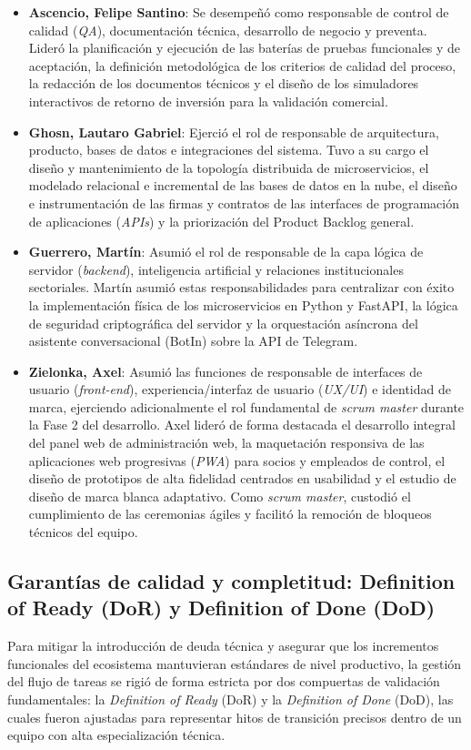 \documentclass[conference, a4paper]{IEEEtran}
\begin{document}
\begin{itemize}
    \item \textbf{Ascencio, Felipe Santino}: Se desempe\~n\'o como responsable de control de calidad (\textit{QA}), documentaci\'on t\'ecnica, desarrollo de negocio y preventa. Lider\'o la planificaci\'on y ejecuci\'on de las bater\'ias de pruebas funcionales y de aceptaci\'on, la definici\'on metodol\'ogica de los criterios de calidad del proceso, la redacci\'on de los documentos t\'ecnicos y el dise\~no de los simuladores interactivos de retorno de inversi\'on para la validaci\'on comercial. 
    \item \textbf{Ghosn, Lautaro Gabriel}: Ejerci\'o el rol de responsable de arquitectura, producto, bases de datos e integraciones del sistema. Tuvo a su cargo el dise\~no y mantenimiento de la topolog\'ia distribuida de microservicios, el modelado relacional e incremental de las bases de datos en la nube, el dise\~no e instrumentaci\'on de las firmas y contratos de las interfaces de programaci\'on de aplicaciones (\textit{APIs}) y la priorizaci\'on del Product Backlog general.
    \item \textbf{Guerrero, Mart\'in}: Asumi\'o el rol de responsable de la capa l\'ogica de servidor (\textit{backend}), inteligencia artificial y relaciones institucionales sectoriales. Martín asumi\'o estas responsabilidades para centralizar con \'exito la implementaci\'on f\'isica de los microservicios en Python y FastAPI, la l\'ogica de seguridad criptogr\'afica del servidor y la orquestaci\'on as\'incrona del asistente conversacional (BotIn) sobre la API de Telegram.
    \item \textbf{Zielonka, Axel}: Asumi\'o las funciones de responsable de interfaces de usuario (\textit{front-end}), experiencia/interfaz de usuario (\textit{UX/UI}) e identidad de marca, ejerciendo adicionalmente el rol fundamental de \textit{scrum master} durante la Fase 2 del desarrollo. Axel lider\'o de forma destacada el desarrollo integral del panel web de administraci\'on web, la maquetaci\'on responsiva de las aplicaciones web progresivas (\textit{PWA}) para socios y empleados de control, el dise\~no de prototipos de alta fidelidad centrados en usabilidad y el estudio de dise\~no de marca blanca adaptativo. Como \textit{scrum master}, custodi\'o el cumplimiento de las ceremonias \'agiles y facilit\'o la remoci\'on de bloqueos t\'ecnicos del equipo.
\end{itemize}

\subsection{Garant\'ias de calidad y completitud: Definition of Ready (DoR) y Definition of Done (DoD)}
Para mitigar la introducci\'on de deuda t\'ecnica y asegurar que los incrementos funcionales del ecosistema mantuvieran est\'andares de nivel productivo, la gesti\'on del flujo de tareas se rigi\'o de forma estricta por dos compuertas de validaci\'on fundamentales: la \textit{Definition of Ready} (DoR) y la \textit{Definition of Done} (DoD), las cuales fueron ajustadas para representar hitos de transici\'on precisos dentro de un equipo con alta especializaci\'on t\'ecnica.
\end{document}

